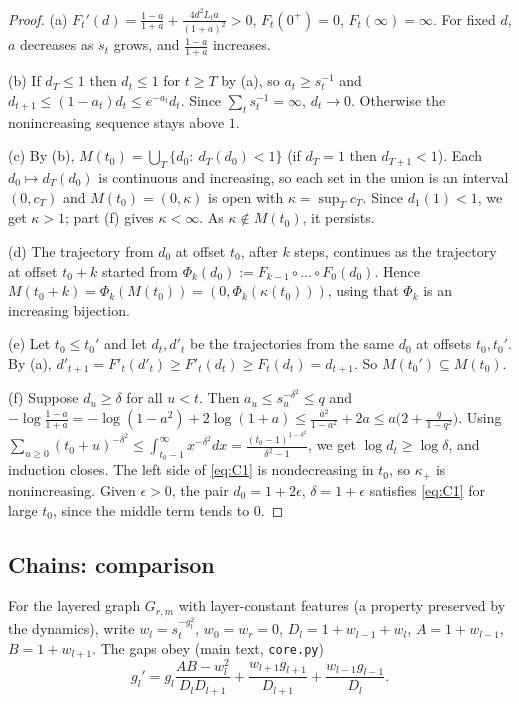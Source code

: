 \documentclass[11pt]{article}
\theoremstyle{definition}
\theoremstyle{remark}
\begin{document}
\begin{proof}
(a) $F_t'(d)=\frac{1-a}{1+a}+\frac{4d^2L_ta}{(1+a)^2}>0$, $F_t(0^+)=0$, $F_t(\infty)=\infty$.
For fixed $d$, $a$ decreases as $s_t$ grows, and $\frac{1-a}{1+a}$ increases.

(b) If $d_T\le1$ then $d_t\le1$ for $t\ge T$ by (a), so $a_t\ge s_t^{-1}$ and
$d_{t+1}\le(1-a_t)d_t\le e^{-a_t}d_t$. Since $\sum_t s_t^{-1}=\infty$, $d_t\to0$. Otherwise the
nonincreasing sequence stays above $1$.

(c) By (b), $M(t_0)=\bigcup_T\{d_0:\ d_T(d_0)<1\}$ (if $d_T=1$ then $d_{T+1}<1$). Each
$d_0\mapsto d_T(d_0)$ is continuous and increasing, so each set in the union is an interval $(0,c_T)$ and
$M(t_0)=(0,\kappa)$ is open with $\kappa=\sup_Tc_T$. Since $d_1(1)<1$, we get $\kappa>1$; part (f)
gives $\kappa<\infty$. As $\kappa\notin M(t_0)$, it persists.

(d) The trajectory from $d_0$ at offset $t_0$, after $k$ steps, continues as the trajectory at
offset $t_0+k$ started from $\Phi_k(d_0):=F_{k-1}\circ\dots\circ F_0(d_0)$. Hence
$M(t_0+k)=\Phi_k(M(t_0))=(0,\Phi_k(\kappa(t_0)))$, using that $\Phi_k$ is an increasing bijection.

(e) Let $t_0\le t_0'$ and let $d_t,d'_t$ be the trajectories from the same $d_0$ at offsets $t_0, t_0'$. By (a),
$d'_{t+1}=F'_t(d'_t)\ge F'_t(d_t)\ge F_t(d_t)=d_{t+1}$. So $M(t_0')\subseteq M(t_0)$.

(f) Suppose $d_u\ge\delta$ for all $u<t$. Then $a_u\le s_u^{-\delta^2}\le q$ and
$-\log\frac{1-a}{1+a}=-\log(1-a^2)+2\log(1+a)\le \frac{a^2}{1-a^2}+2a\le a\big(2+\frac{q}{1-q^2}\big)$.
Using $\sum_{u\ge0}(t_0+u)^{-\delta^2}\le\int_{t_0-1}^\infty x^{-\delta^2}dx=\frac{(t_0-1)^{1-\delta^2}}{\delta^2-1}$,
we get $\log d_t\ge\log\delta$, and induction closes. The left side of \eqref{eq:C1} is
nondecreasing in $t_0$, so $\kappa_+$ is nonincreasing. Given $\epsilon>0$, the pair $d_0=1+2\epsilon$,
$\delta=1+\epsilon$ satisfies \eqref{eq:C1} for large $t_0$, since the middle term tends to $0$.
\end{proof}

\subsection{Chains: comparison}
For the layered graph $G_{r,m}$ with layer-constant features (a property preserved by the
dynamics), write $w_l=s_t^{-g_l^2}$, $w_0=w_r=0$, $D_l=1+w_{l-1}+w_l$, $A=1+w_{l-1}$, $B=1+w_{l+1}$. The
gaps obey (main text, \texttt{core.py})
\begin{equation}\label{eq:chain}
g_l'=g_l\frac{AB-w_l^2}{D_lD_{l+1}}+\frac{w_{l+1}g_{l+1}}{D_{l+1}}+\frac{w_{l-1}g_{l-1}}{D_l}.
\end{equation}
\end{document}
